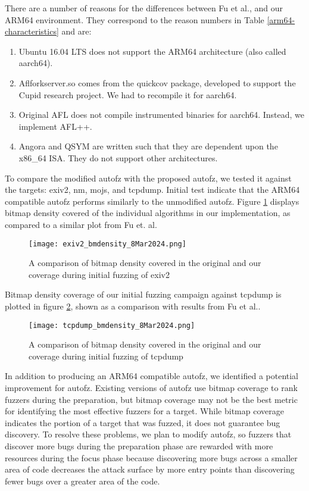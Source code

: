 There are a number of reasons for the differences between Fu et al.,
and our ARM64 environment. They correspond to the reason numbers in Table \ref{arm64-characteristics}
and are:
\begin{enumerate}
    \item Ubuntu 16.04 LTS does not support the ARM64 architecture (also called aarch64).
    \item Aflforkserver.so comes from the quickcov package, developed to support the Cupid
    research project\cite{guler2020cupid}. We had to recompile it for aarch64.
    \item Original AFL does not compile instrumented binaries for aarch64. Instead, we
    implement AFL++.
    \item Angora and QSYM are written such that they are dependent upon the x86\_64 ISA.
    They do not support other architectures.
\end{enumerate}

To compare the  modified autofz with the proposed autofz, we tested it against the targets: exiv2,
nm, mojs, and tcpdump. Initial test indicate that the ARM64 compatible autofz performs similarly to
the unmodified autofz. Figure \ref{fig:exiv2_bmdensity_8Mar2024} displays bitmap density covered of
the individual algorithms in our implementation, as compared to a similar plot from Fu et. al\cite{Fu}.

\begin{figure}
    \texttt{[image: exiv2\_bmdensity\_8Mar2024.png]}
    \centering
    \caption{A comparison of bitmap density covered in the original\cite{Fu} and our coverage during
     initial fuzzing of exiv2}
    \label{fig:exiv2_bmdensity_8Mar2024}
\end{figure}

Bitmap density coverage of our initial fuzzing campaign against tcpdump is plotted in figure
\ref{fig:tcpdump_bmdensity_8Mar2024}, shown as a comparison with results from Fu et al.\cite{Fu}.


\begin{figure}
    \texttt{[image: tcpdump\_bmdensity\_8Mar2024.png]}
    \centering
    \caption{A comparison of bitmap density covered in the original\cite{Fu} and our coverage during initial fuzzing of tcpdump}
    \label{fig:tcpdump_bmdensity_8Mar2024}
\end{figure}

In addition to producing an ARM64 compatible autofz, we identified a potential improvement for autofz.
Existing versions of autofz use bitmap coverage to rank fuzzers during the preparation, but bitmap
coverage may not be the best metric for identifying the most effective fuzzers for a target. While
bitmap coverage indicates the portion of a target that was fuzzed, it does not guarantee bug discovery.
To resolve these problems, we plan to modify autofz, so fuzzers that discover more bugs during the
preparation phase are rewarded with more resources during the focus phase because discovering more bugs
across a smaller area of code decreases the attack surface by more entry points than discovering fewer
bugs over a greater area of the code.

